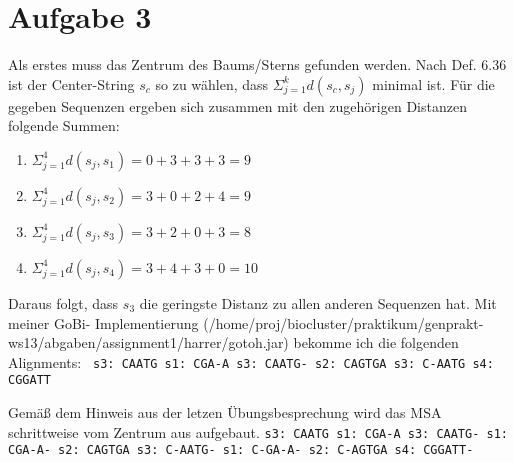 \documentclass[a4paper,10pt,oneside,reqno]{scrartcl}
\begin{document}
\section*{Aufgabe 3}%
Als erstes muss das Zentrum des Baums/Sterns gefunden werden. Nach Def. 6.36 ist der Center-String $s_c$ 
so zu wählen, dass $\Sigma_{j=1}^k d(s_c, s_j)$ minimal ist. Für die gegeben Sequenzen ergeben sich
zusammen mit den zugehörigen Distanzen folgende Summen:
\begin{enumerate}
 \item $\Sigma_{j=1}^4 d(s_j, s_1) = 0 + 3 + 3 + 3 = 9$
 \item $\Sigma_{j=1}^4 d(s_j, s_2) = 3 + 0 + 2 + 4 = 9$
 \item $\Sigma_{j=1}^4 d(s_j, s_3) = 3 + 2 + 0 + 3 = 8$
 \item $\Sigma_{j=1}^4 d(s_j, s_4) = 3 + 4 + 3 + 0 = 10$
\end{enumerate}
Daraus folgt, dass $s_3$ die geringste Distanz zu allen anderen Sequenzen hat. Mit meiner GoBi-
Implementierung (/home/proj/biocluster/praktikum/genprakt-ws13/abgaben/assignment1/harrer/gotoh.jar) bekomme ich die folgenden Alignments:\newline
\texttt{
s3: CAATG\newline
s1: CGA-A\newline\newline
s3: CAATG-\newline
s2: CAGTGA\newline\newline
s3: C-AATG\newline
s4: CGGATT\newline}

Gemäß dem Hinweis aus der letzen Übungsbesprechung wird das MSA schrittweise vom Zentrum aus aufgebaut.
\texttt{s3: CAATG\newline
s1: CGA-A\newline\newline
s3: CAATG-\newline
s1: CGA-A-\newline
s2: CAGTGA
\newline\newline
s3: C-AATG-\newline
s1: C-GA-A-\newline
s2: C-AGTGA\newline
s4: CGGATT-}
\end{document}
